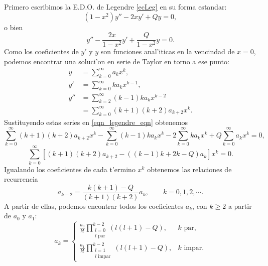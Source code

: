 Primero escribimos la E.D.O. de Legendre \eqref{ecLeg} en su forma estandar:
\begin{equation}
\label{eqn_legendre_eqn}
\left( 1 - x^2 \right) y'' - 2 x y' + Q y = 0,
\end{equation}
o bien
\begin{equation}
\label{eqn_legendre_eqn_norm}
y'' - \frac{2 x}{1 - x^2} y' + \frac{ Q }{1 - x^2} y = 0.
\end{equation}
Como los coeficientes de $y'$ y $y$ son funciones anal'iticas en la vencindad de 
$x = 0$, podemos encontrar una soluci'on en serie de Taylor en torno a ese punto:
\begin{align*}
y &= \sum_{k=0}^\infty a_k x^k ,
\\
y' &= \sum_{k=0}^\infty k a_k x^{k-1} ,
\\
y'' &= \sum_{k=2}^\infty (k-1) k a_k x^{k-2} 
\\
&= \sum_{k=0}^\infty (k+1) (k+2) a_{k+2} x^k.
\end{align*}
Sustituyendo estas series en \eqref{eqn_legendre_eqn} obtenemos
\begin{equation}
\sum_{k=0}^\infty (k+1) (k+2) a_{k+2} x^k
- \sum_{k=0}^\infty (k-1) k a_k x^k
- 2 \sum_{k=0}^\infty k a_k x^k
+ Q \sum_{k=0}^\infty a_k x^k= 0 ,
\end{equation}
\begin{equation}
\sum_{k=0}^\infty \left[ (k+1)(k+2) a_{k+2} - \left( (k-1) k + 2 k - Q \right) a_k \right] x^k = 0.
\end{equation}
Igualando los coeficientes de cada t'ermino $x^k$ obtenemos las relaciones de recurrencia
\begin{equation}\label{recLeg}
a_{k+2} = \frac{ k (k+1) - Q}{ (k+1)(k+2) } a_k, \qquad k=0,1,2,\cdots.
\end{equation}
A partir de ellas, podemos encontrar todos los coeficientes $a_k$, con $k\ge 2$ a partir de $a_0$ y $a_1$:
\begin{equation}
a_k =
\begin{cases}
\displaystyle{
\frac{a_0}{k!} \prod_{\substack{l=0 \\ l \text{ par}}}^{k-2} 
\left( l (l+1) - Q \right),
}
&k \text{ par}, 
\\
\displaystyle{
\frac{a_1}{k!} \prod_{\substack{l=1 \\ l \text{ impar}}}^{k-2} \left( l (l+1) - Q \right),
}
&k \text{ impar} .
\end{cases}
\end{equation}

